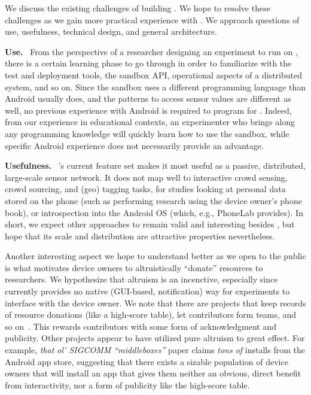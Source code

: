 We discuss the existing challenges of building \sysname. We hope to 
resolve these challenges as we gain more practical experience with 
\sysname.
We approach questions of use, usefulness, technical design, and
general architecture.


\textbf{Use.}~
From the perspective of a researcher designing an experiment to 
run on \sysname, there is a certain learning phase 
to go through in order to familiarize with the test and deployment 
tools, the sandbox API, operational aspects of a distributed system, 
and so on. Since the sandbox uses a different programming language 
than Android usually does, and the patterns to access sensor values 
are different as well, no previous experience with Android is required 
to program for \sysname. Indeed, from our experience in 
educational contexts, an experimenter who brings along any programming 
knowledge will quickly learn how to use the sandbox, while specific 
Android experience does not necessarily provide an advantage.


\textbf{Usefulness.}~
\sysname's current feature set makes it most 
useful as a passive, distributed, large-scale sensor network. 
It does not map well to interactive crowd sensing, crowd sourcing, 
and (geo) tagging tasks, for studies looking at personal data stored 
on the phone (such as performing research using the device owner's 
phone book),
or introspection into the Android OS (which, e.g., PhoneLab provides). 
In short, we expect other approaches to remain valid and interesting 
besides \sysname, but hope that its scale and distribution 
are attractive properties nevertheless.


Another interesting aspect we hope to understand better as 
we open \sysname to the public is what motivates device 
owners to altruistically ``donate'' resources to researchers. 
We hypothesize that altruism is an incenctive, especially since 
\sysname currently provides no native (GUI-based, 
notification) way for experiments to interface with the device 
owner. We note that there are projects that keep records of 
resource donations (like a high-score table), let contributors form 
teams, and so on~\cite{OpenWLANMap}.
This rewards contributors with some form of acknowledgment and 
publicity.
Other projects appear to have utilized pure altruism to great effect.
For example, \textit{that ol' SIGCOMM ``middleboxes''} paper 
\cite{it}  claims \textit{tons of} installs from the Android app 
store, suggesting that there exists a sizable population of device 
owners that will install an app that gives them neither an obvious, 
direct benefit from interactivity, nor a form of publicity like 
the high-score table.


